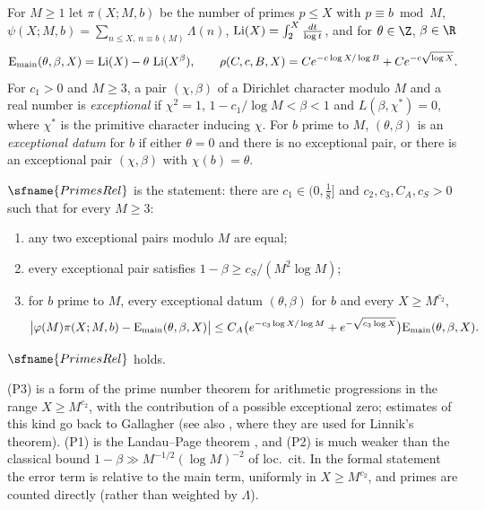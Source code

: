 For $M\ge1$ let $\pi(X;M,b)$ be the number of primes $p\le X$ with $p\equiv b\bmod M$, $\psi(X;M,b)=\sum_{n\le X,\,n\equiv b\,(M)}\Lambda(n)$,
$\operatorname{Li}(X)=\int_2^X\frac{dt}{\log t}$, and for $\theta\in\Z$, $\beta\in\R$
\[
\mathrm{E}_{\mathrm{main}}(\theta,\beta,X)=\operatorname{Li}(X)-\theta\,\operatorname{Li}(X^\beta),\qquad
\rho(C,c,B,X)=Ce^{-c\log X/\log B}+Ce^{-c\sqrt{\log X}} .
\]
For $c_1>0$ and $M\ge3$, a pair $(\chi,\beta)$ of a Dirichlet character modulo $M$ and a real number is \emph{exceptional} if
$\chi^2=1$, $1-c_1/\log M<\beta<1$ and $L(\beta,\chi^*)=0$, where $\chi^*$ is the primitive character inducing $\chi$. For $b$ prime
to $M$, $(\theta,\beta)$ is an \emph{exceptional datum} for $b$ if either $\theta=0$ and there is no exceptional pair, or there is
an exceptional pair $(\chi,\beta)$ with $\chi(b)=\theta$.

$\sfname{PrimesRel}$ is the statement: there are $c_1\in(0,\frac18]$ and $c_2,c_3,C_A,c_S>0$ such that for every $M\ge3$:
\begin{enumerate}[label=(P\arabic*)]
\item any two exceptional pairs modulo $M$ are equal;
\item every exceptional pair satisfies $1-\beta\ge c_S/(M^2\log M)$;
\item for $b$ prime to $M$, every exceptional datum $(\theta,\beta)$ for $b$ and every $X\ge M^{c_2}$,
\[
\bigl|\varphi(M)\pi(X;M,b)-\mathrm{E}_{\mathrm{main}}(\theta,\beta,X)\bigr|\le C_A\bigl(e^{-c_3\log X/\log M}+e^{-\sqrt{c_3\log X}}\bigr)\mathrm{E}_{\mathrm{main}}(\theta,\beta,X).
\]
\end{enumerate}

\begin{theorem}\label{pf:sh-div:primesrel}
$\sfname{PrimesRel}$ holds.
\end{theorem}

(P3) is a form of the prime number theorem for arithmetic progressions in the range $X\ge M^{c_2}$, with the contribution of a
possible exceptional zero; estimates of this kind go back to Gallagher \cite{Gallagher1970} (see also \cite[Ch.~18]{IwaniecKowalski2004},
where they are used for Linnik's theorem). (P1) is the Landau--Page theorem \cite[Ch.~14]{Davenport2000}, and (P2) is much weaker
than the classical bound $1-\beta\gg M^{-1/2}(\log M)^{-2}$ of loc.\ cit. In the formal statement the error term is relative to the
main term, uniformly in $X\ge M^{c_2}$, and primes are counted directly (rather than weighted by $\Lambda$).

